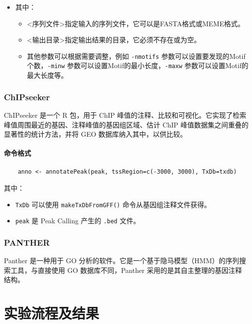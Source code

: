 \documentclass[UTF8]{ctexart}
\begin{document}
\begin{itemize}
	\item 其中：
	\begin{itemize}
		\item <序列文件>指定输入的序列文件，它可以是FASTA格式或MEME格式。
		\item <输出目录>指定输出结果的目录，它必须不存在或为空。
		\item 其他参数可以根据需要调整，例如 \verb|-nmotifs| 参数可以设置要发现的Motif个数，\verb|-minw| 参数可以设置Motif的最小长度，\verb|-maxw| 参数可以设置Motif的最大长度等。
	\end{itemize}
\end{itemize}

\subsubsection{ChIPseeker}

ChIPseeker 是一个 R 包，用于 ChIP 峰值的注释、比较和可视化。它实现了检索峰值周围最近的基因、注释峰值的基因组区域、估计 ChIP 峰值数据集之间重叠的显著性的统计方法，并将 GEO 数据库纳入其中，以供比较。

\paragraph*{命令格式}
\begin{lstlisting}
	anno <- annotatePeak(peak, tssRegion=c(-3000, 3000), TxDb=txdb)
\end{lstlisting}

其中：

\begin{itemize}
	\item \verb|TxDb| 可以使用 \verb|makeTxDbFromGFF()| 命令从基因组注释文件获得。
	\item \verb|peak| 是 Peak Calling 产生的 \verb|.bed| 文件。 
\end{itemize}

\subsubsection{PANTHER}

Panther 是一种用于 GO 分析的软件。它是一个基于隐马模型（HMM）的序列搜索工具，与直接使用 GO 数据库不同，Panther 采用的是其自主整理的基因注释结构。


\section{实验流程及结果}
\end{document}

